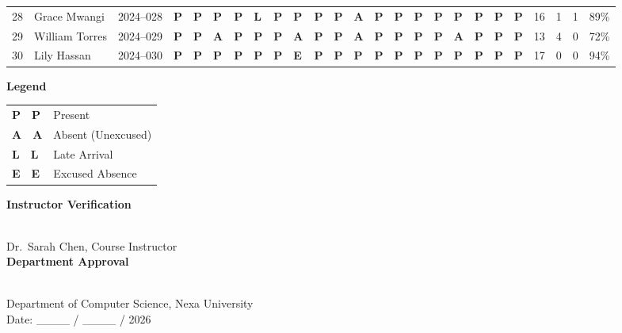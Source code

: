 \documentclass[12pt,landscape]{article}
\newcommand{\mkP}{\textcolor{green!50!black}{\textbf{P}}}
\newcommand{\mkA}{\textcolor{red!60!black}{\textbf{A}}}
\newcommand{\mkL}{\textcolor{orange!70!black}{\textbf{L}}}
\newcommand{\mkE}{\textcolor{secondary}{\textbf{E}}}
\begin{document}
\begin{longtable}{C{0.40cm} L{4.05cm} C{1.60cm} *{18}{C{0.78cm}} C{0.60cm} C{0.60cm} C{0.60cm} C{0.70cm}}
28 & Grace Mwangi       & 2024--028 &
\mkP & \mkP & \mkP & \mkP & \mkL & \mkP &
\mkP & \mkP & \mkP & \mkA & \mkP & \mkP &
\mkP & \mkP & \mkP & \mkP & \mkP & \mkP &
16 & 1 & 1 & 89\% \\

29 & William Torres     & 2024--029 &
\mkP & \mkP & \mkA & \mkP & \mkP & \mkP &
\mkA & \mkP & \mkP & \mkA & \mkP & \mkP &
\mkP & \mkP & \mkA & \mkP & \mkP & \mkP &
13 & 4 & 0 & 72\% \\

30 & Lily Hassan        & 2024--030 &
\mkP & \mkP & \mkP & \mkP & \mkP & \mkP &
\mkE & \mkP & \mkP & \mkP & \mkP & \mkP &
\mkP & \mkP & \mkP & \mkP & \mkP & \mkP &
17 & 0 & 0 & 94\% \\

\end{longtable}

\vspace{8pt}

\noindent
\begin{tcolorbox}[
  colback=bglight,
  colframe=primary!20,
  width=\textwidth,
  boxrule=0.5pt,
  arc=2pt,
  left=10pt, right=10pt, top=8pt, bottom=8pt
]
  \footnotesize
  \begin{minipage}[t]{0.48\textwidth}
    \color{primary}
    \textbf{\small Legend}\\[4pt]
    \begin{tabular}{@{}p{}p{}@{}}
      \mkP\ \ \textbf{P} & Present \\
      \mkA\ \ \textbf{A} & Absent (Unexcused) \\
      \mkL\ \ \textbf{L} & Late Arrival \\
      \mkE\ \ \textbf{E} & Excused Absence \\
    \end{tabular}
  \end{minipage}%
  \begin{minipage}[t]{0.52\textwidth}
    \raggedleft
    \color{primary}
    \textbf{\small Instructor Verification}\\[6pt]
    \\[2pt]
    \textcolor{primary!60}{\scriptsize Dr.\ Sarah Chen, Course Instructor}\\[8pt]
    \textbf{\small Department Approval}\\[6pt]
    \\[2pt]
    \textcolor{primary!60}{\scriptsize Department of Computer Science, Nexa University}\\[4pt]
    \textcolor{primary!40}{\scriptsize Date: \_\_\_\_ / \_\_\_\_ / 2026}
  \end{minipage}
\end{tcolorbox}
\end{document}
